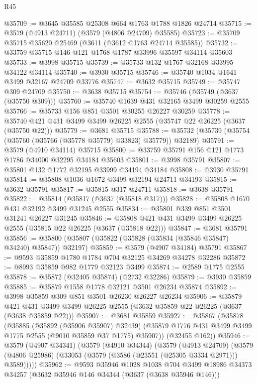 \begin{lexlean}{R45}
\begin{coremodule}
@35709 := @3645 @35585 @25308 @664 @1763 @1788 @1826 @24714
@35715 := @3579 (@4913 @24711) (@3579 (@4806 @24709) @35585)
@35723 := @35709 @35715 @35620 @25469 (@3611 (@3612 @1763 @24714 @35585))
@35732 := @33759 @35715 @146 @121 @1768 @1787 @33996 @35597 @34114 @35603
@35733 := @3998 @35715
@35739 := @35733 @132 @1767 @32168 @33995 @34122 @34114
@35740 := @3930 @35715
@35746 := @35740 @1034 @1641 @3499 @32167 @24709 @33776
@35747 := @3632 @35715
@35749 := @35747 @309 @24709
@35750 := @3638 @35715
@35754 := @35746 (@35749 (@3637 (@35750 @309)))
@35760 := @35740 @1639 @431 @32165 @3499 @30259 @2555
@35766 := @35733 @156 @851 @3501 @30255 @26227 @30259
@35778 := @35740 @421 @431 @3499 @3499 @26225 @2555 (@35747 @22 @26225 (@3637 (@35750 @22)))
@35779 := @3681 @35715
@35788 := @35732 (@35739 (@35754 (@35760 (@35766 (@35778 @35779) @33823) @35779)) @32189)
@35791 := @3579 (@4910 @34114) @35715
@35800 := @33759 @35791 @156 @121 @1773 @1786 @34000 @32295 @34184 @35603
@35801 := @3998 @35791
@35807 := @35801 @132 @1772 @32195 @33999 @34194 @34184
@35808 := @3930 @35791
@35814 := @35808 @1036 @1672 @3499 @32194 @24711 @34193
@35815 := @3632 @35791
@35817 := @35815 @317 @24711
@35818 := @3638 @35791
@35822 := @35814 (@35817 (@3637 (@35818 @317)))
@35828 := @35808 @1670 @431 @32192 @3499 @31245 @2555
@35834 := @35801 @339 @851 @3501 @31241 @26227 @31245
@35846 := @35808 @421 @431 @3499 @3499 @26225 @2555 (@35815 @22 @26225 (@3637 (@35818 @22)))
@35847 := @3681 @35791
@35856 := @35800 (@35807 (@35822 (@35828 (@35834 (@35846 @35847) @34240) @35847)) @32197)
@35859 := @3579 (@4907 @34184) @35791
@35867 := @9593 @35859 @1780 @1784 @704 @32125 @34269 @34278 @32286
@35872 := @8993 @35859 @982 @1779 @32123 @3499
@35874 := @2589 @1775 @2555
@35878 := @35872 (@32405 @35874) (@2732 @32286)
@35879 := @3930 @35859
@35885 := @35879 @1558 @1778 @32121 @3501 @26234 @35874
@35892 := @3998 @35859 @309 @851 @3501 @26230 @26227 @26234
@35906 := @35879
    @421
    @431
    @3499
    @3499
    @26225
    @2555
    (@3632 @35859 @22 @26225 (@3637 (@3638 @35859 @22)))
@35907 := @3681 @35859
@35927 := @35867
    (@35878
      (@35885
        (@35892 (@35906 @35907) @32439)
        (@35879 @1776 @431 @3499 @3499 @1775 @2555 (@9010 @35859 @37 @1775) @35907))
      (@32455 @162))
@35946 := @3579
    (@4907 @34341)
    (@3579
      (@4910 @34344)
      (@3579
        (@4913 @24709)
        (@3579 (@4806 @25986) (@33053 (@3579 (@3586 (@23551 (@25305 @3334 @2971))) @3589)))))
@35962 := @9593
    @35946
    @1028
    @1038
    @704
    @3499
    @18986
    @34373
    @34257
    (@3632 @35946 @146 @34344 (@3637 (@3638 @35946 @146)))

\end{coremodule}
\end{lexlean}
